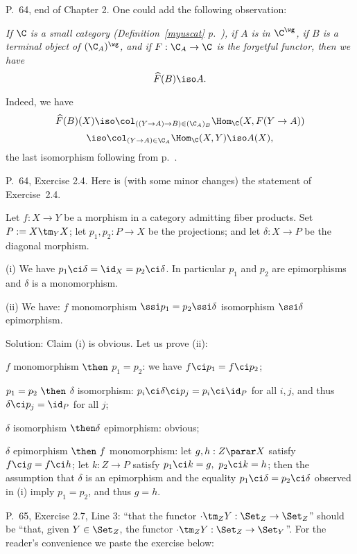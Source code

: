 \documentclass[12pt]{article}
\theoremstyle{remark}
\theoremstyle{definition}
\begin{document}
%

\begin{s}
P.~64, end of Chapter 2. One could add the following observation: 

\emph{If $\C$ is a small category (Definition~\ref{myuscat} p.~), if $A$ is in $\C^\wg$, if $B$ is a terminal object of $(\C_A)^\wg$, and if $F:\C_A\to\C$ is the forgetful functor, then we have} 
$$
\widehat F(B)\iso A.
$$ 

Indeed, we have 
$$
\widehat F(B)(X)\iso\col_{((Y\to A)\to B)\in(\C_A)_B}\Hom_\C(X,F(Y\to A))
$$
$$
\iso\col_{(Y\to A)\in\C_A}\Hom_\C(X,Y)\iso A(X),
$$ 
the last isomorphism following from  p.~. 
\end{s}


P.~64, Exercise 2.4. Here is (with some minor changes) the statement of Exercise~2.4. 

Let $f:X\to Y$ be a morphism in a category admitting fiber products. Set $P:=X\tm_YX$; let $p_1,p_2:P\to X$ be the projections; and let $\delta:X\to P$ be the diagonal morphism.

\nn(i) We have $p_1\ci\delta=\id_X=p_2\ci\delta$. In particular $p_1$ and $p_2$ are epimorphisms and $\delta$ is a monomorphism.

\nn(ii) We have: $f$ monomorphism $\ssi p_1=p_2\ssi\delta$ isomorphism $\ssi\delta$ epimorphism. %

Solution: Claim (i) is obvious. Let us prove (ii):

\nn $f$ monomorphism $\then$ $p_1=p_2$: we have $f\ci p_1=f\ci p_2$;

\nn$p_1=p_2\ \then$ $\delta$ isomorphism: $p_i\ci\delta\ci p_j=p_i\ci\id_P$ for all $i,j$, and thus $\delta\ci p_j=\id_P$ for all $j$;

\nn$\delta$ isomorphism $\then\delta$ epimorphism: obvious;

\nn$\delta$ epimorphism $\then\ f$ monomorphism: let $g,h:Z\parar X$ satisfy $f\ci g=f\ci h$; let $k:Z\to P$ satisfy $p_1\ci k=g,\ p_2\ci k=h$; then the assumption that $\delta$ is an epimorphism and the equality $p_1\ci\delta=p_2\ci\delta$ observed in (i) imply $p_1=p_2$, and thus $g=h$.


P.~65, Exercise 2.7, Line 3: ``that the functor $\cdot\tm_ZY:\Set_Z\to\Set_Z$'' should be ``that, given $Y\in\Set_Z$, the functor $\cdot\tm_ZY:\Set_Z\to\Set_Y$''. For the reader's convenience we paste the exercise below:
\end{document}
